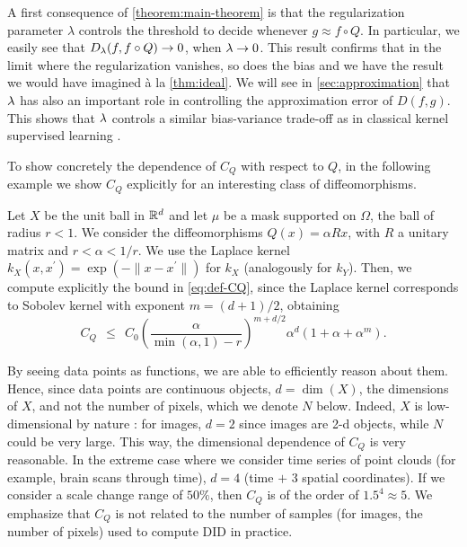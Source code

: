 A first consequence of \cref{theorem:main-theorem} is that the regularization parameter $\lambda$ controls the threshold to decide whenever $g \approx f \circ Q$. In particular, we easily see that $D_\lambda(f, f \circ Q) \to 0$, when $\lambda \to 0$. This result confirms that in the limit where the regularization vanishes, so does the bias and we have the result we would have imagined à la \cref{thm:ideal}. We will see in \cref{sec:approximation} that $\lambda$ has also an important role in controlling the approximation error of $D(f,g)$. This shows that $\lambda$ controls a similar bias-variance trade-off as in classical kernel supervised learning \cite{shawe-taylor2004}.

To show concretely the dependence of $C_Q$ with respect to $Q$, in the following example we show $C_Q$ explicitly for an interesting class of diffeomorphisms.

\begin{example}\label{ex:diffeo}
Let $X$ be the unit ball in $\mathbb R^d$ and let $\mu$ be a mask supported on $\Omega$, the ball of radius $r < 1$. We consider the diffeomorphisms $Q(x) = \alpha R x$, with $R$ a unitary matrix and $r < \alpha < 1/r$. We use the Laplace kernel $k_X(x,x^\prime) = \exp(-\|x-x^\prime\|)$ for $k_X$ (analogously for $k_Y$).
Then, we compute explicitly the bound in \cref{eq:def-CQ}, since the Laplace kernel corresponds to Sobolev kernel with exponent $m = (d+1)/2$, obtaining
$$C_Q ~~\leq~~ C_0 \left(\frac{\alpha}{\min(\alpha,1) - r}\right)^{m+d/2}\alpha^d (1 + \alpha + \alpha^m).$$
\end{example}
\begin{remark}
By seeing data points as functions, we are able to efficiently reason about them. Hence, since data points are continuous objects, $d=\dim(X)$, the dimensions of $X$, and not the number of pixels, which we denote $N$ below. Indeed, $X$ is low-dimensional by nature : for images, $d=2$ since images are 2-d objects, while $N$ could be very large. This way, the dimensional dependence of $C_Q$ is very reasonable. In the extreme case where we consider time series of point clouds (for example, brain scans through time), $d = 4$ (time $+$ 3 spatial coordinates). If we consider a scale change range of $50\%$, then $C_Q$ is of the order of $1.5^4 \approx 5$. We emphasize that $C_Q$ is not related to the number of samples (for images, the number of pixels) used to compute DID in practice.
\end{remark}
